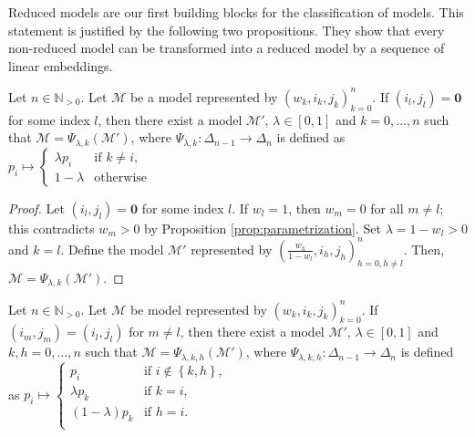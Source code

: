 Reduced models are our first building blocks for the classification of models. This statement is justified by the following two propositions. They show that every non-reduced model can be transformed into a reduced model by a sequence of linear embeddings.

\begin{proposition}\label{prop:linear-embedding-1}
    Let \( n \in \mathbb{N}_{>0} \).
    Let \( \mathcal{M} \) be a model represented by \( (w_k, i_k, j_k)_{k=0}^n \). If \( (i_l, j_l) = \mathbf{0} \) for some index \( l \), then there exist a model \( \mathcal{M}' \), \( \lambda \in [0,1] \) and \( k = 0, \dots, n \) such that \( \mathcal{M} = \Psi_{\lambda,k}(\mathcal{M}') \), where \( \Psi_{\lambda, k}: \Delta_{n-1} \to \Delta_n \) is defined as \(  p_i \mapsto \begin{cases}
        \lambda p_i & \text{if } k \neq i, \\
        1-\lambda & \text{otherwise }
    \end{cases} \)
\end{proposition}

\begin{proof}
    Let \( (i_l, j_l) = \mathbf{0} \) for some index \( l \). If \( w_l = 1 \), then \( w_m = 0 \) for all \( m \neq l \); this contradicts \( w_m > 0 \) by Proposition \ref{prop:parametrization}. Set \( \lambda = 1 - w_l > 0 \) and \( k = l \). Define the model \( \mathcal{M}' \) represented by \( \left(\frac{w_h}{1-w_l}, i_h, j_h\right)^n_{h=0, h \neq l} \).
    Then, \( \mathcal{M} = \Psi_{\lambda,k}(\mathcal{M}') \).
\end{proof}

\begin{proposition}\label{prop:linear-embedding-2}
    Let \( n \in \mathbb{N}_{>0} \).
    Let \( \mathcal{M} \) be model represented by \( (w_k, i_k, j_k)_{k=0}^n \). If \( (i_m, j_m) = (i_l, j_l)  \) for \( m \neq l \), then there exist a model \( \mathcal{M}' \), \( \lambda \in [0,1] \) and \( k,h = 0, \dots, n \) such that \( \mathcal{M} = \Psi_{\lambda,k,h}(\mathcal{M}') \), 
    where \( \Psi_{\lambda, k,h}: \Delta_{n-1} \to \Delta_n \) is defined as \(  p_i \mapsto \begin{cases}
         p_i & \text{if } i \notin \left\{ k,h \right\}, \\
        \lambda p_k & \text{if } k = i, \\
        (1-\lambda) p_k & \text{if } h = i. \\
    \end{cases} \)
\end{proposition}

